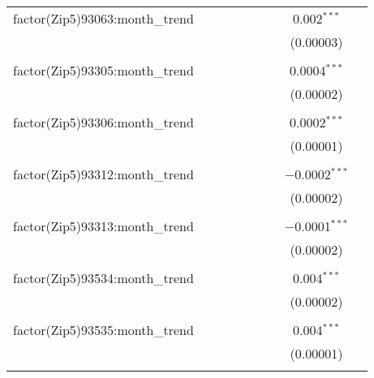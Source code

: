 \begin{table}[H]
{\begin{tabular}{@{\extracolsep{5pt}}lcccccccc}
  factor(Zip5)93063:month\_trend &  &  &  &  &  &  & 0.002$^{***}$ &  \\  

   &  &  &  &  &  &  & (0.00003) &  \\  

   & & & & & & & & \\  

  factor(Zip5)93305:month\_trend &  &  &  &  &  &  & 0.0004$^{***}$ &  \\  

   &  &  &  &  &  &  & (0.00002) &  \\  

   & & & & & & & & \\  

  factor(Zip5)93306:month\_trend &  &  &  &  &  &  & 0.0002$^{***}$ &  \\  

   &  &  &  &  &  &  & (0.00001) &  \\  

   & & & & & & & & \\  

  factor(Zip5)93312:month\_trend &  &  &  &  &  &  & $-$0.0002$^{***}$ &  \\  

   &  &  &  &  &  &  & (0.00002) &  \\  

   & & & & & & & & \\  

  factor(Zip5)93313:month\_trend &  &  &  &  &  &  & $-$0.0001$^{***}$ &  \\  

   &  &  &  &  &  &  & (0.00002) &  \\  

   & & & & & & & & \\  

  factor(Zip5)93534:month\_trend &  &  &  &  &  &  & 0.004$^{***}$ &  \\  

   &  &  &  &  &  &  & (0.00002) &  \\  

   & & & & & & & & \\  

  factor(Zip5)93535:month\_trend &  &  &  &  &  &  & 0.004$^{***}$ &  \\  

   &  &  &  &  &  &  & (0.00001) &  \\  

   & & & & & & & & \\  


\end{tabular}}
\end{table}
